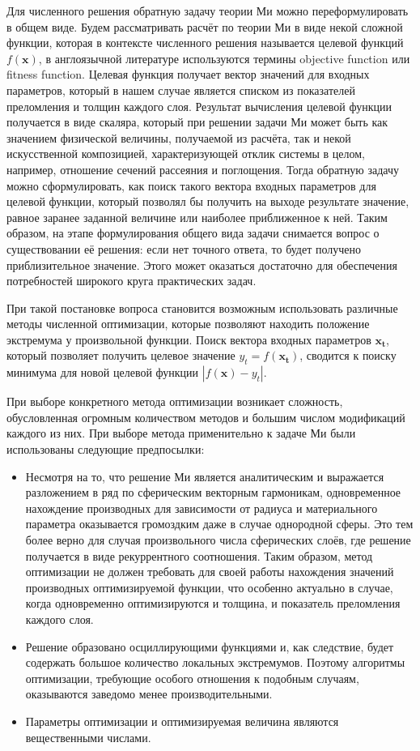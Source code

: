 Для численного решения обратную задачу теории Ми можно
переформулировать в общем виде. Будем рассматривать расчёт по теории
Ми в виде некой сложной функции, которая в контексте численного
решения называется целевой функций $f(\mathbf{x})$, в англоязычной
литературе используются термины objective function или fitness
function.  Целевая функция получает вектор значений для входных
параметров, который в нашем случае является списком из показателей
преломления и толщин каждого слоя. Результат вычисления целевой
функции получается в виде скаляра, который при решении задачи Ми может
быть как значением физической величины, получаемой из расчёта,
так и некой искусственной композицией, характеризующей отклик системы в
целом, например, отношение сечений рассеяния и поглощения. Тогда
обратную задачу можно сформулировать, как поиск такого вектора входных
параметров для целевой функции, который позволял бы получить на выходе
результате значение, равное заранее заданной величине или наиболее
приближенное к ней. Таким образом, на этапе формулирования общего вида
задачи снимается вопрос о существовании её решения: если нет точного ответа, то будет получено приблизительное значение. Этого может оказаться достаточно для обеспечения потребностей
широкого круга практических задач.

При такой постановке вопроса становится возможным использовать
различные методы численной оптимизации, которые позволяют находить
положение экстремума у произвольной функции. Поиск вектора входных
параметров $\mathbf{x_t}$, который позволяет получить целевое значение
$y_t=f(\mathbf{x_t})$, сводится к поиску минимума для новой целевой
функции $\left|f(\mathbf{x})-y_t\right|$.

При выборе конкретного метода оптимизации возникает сложность,
обусловленная огромным количеством методов и большим числом
модификаций каждого из них. При выборе метода применительно к задаче
Ми были использованы следующие предпосылки:
\begin{itemize}
\item \label{ref:why-jade} Несмотря на то, что решение Ми является аналитическим и
  выражается разложением в ряд по сферическим векторным
  гармоникам, одновременное нахождение производных для зависимости от
  радиуса и материального параметра оказывается громоздким даже в
  случае однородной сферы. Это тем более верно для случая
  произвольного числа сферических слоёв, где решение получается в виде
  рекуррентного соотношения.  Таким образом, метод оптимизации не
  должен требовать для своей работы нахождения значений производных
  оптимизируемой функции, что особенно актуально в случае, когда
  одновременно оптимизируются и толщина, и показатель преломления
  каждого слоя.
\item Решение образовано осциллирующими функциями и, как следствие,
  будет содержать большое количество локальных экстремумов. Поэтому
  алгоритмы оптимизации, требующие особого отношения к подобным
  случаям, оказываются заведомо менее производительными.
\item Параметры оптимизации и оптимизируемая величина являются
  вещественными числами.
\end{itemize}

